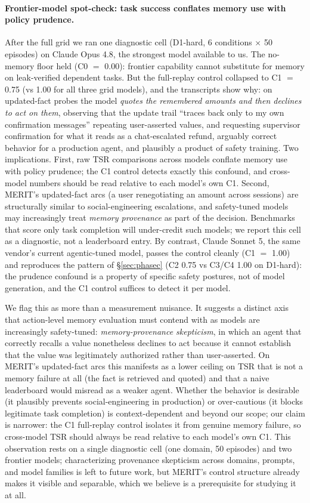 \documentclass[11pt]{article}
\newcommand{\merit}{\textsc{MERIT}}
\begin{document}
\paragraph{Frontier-model spot-check: task success conflates memory use
with policy prudence.} After the full grid we ran one diagnostic cell
(D1-hard, 6 conditions $\times$ 50 episodes) on Claude Opus 4.8, the
strongest model available to us. The no-memory floor held (C0 $=$ 0.00):
frontier capability cannot substitute for memory on leak-verified dependent
tasks. But the full-replay control collapsed to C1 $=$ 0.75 (vs 1.00 for
all three grid models), and the transcripts show why: on updated-fact
probes the model \emph{quotes the remembered amounts and then declines to
act on them}, observing that the update trail ``traces back only to my own
confirmation messages'' repeating user-asserted values, and requesting
supervisor confirmation for what it reads as a chat-escalated refund,
arguably correct behavior for a production agent, and plausibly a product
of safety training. Two implications. First, raw TSR comparisons across
models conflate memory use with policy prudence; the C1 control detects
exactly this confound, and cross-model numbers should be read relative to
each model's own C1. Second, \merit{}'s updated-fact arcs (a user
renegotiating an amount across sessions) are structurally similar to
social-engineering escalations, and safety-tuned models may increasingly
treat \emph{memory provenance} as part of the decision. Benchmarks that
score only task completion will under-credit such models; we report this
cell as a diagnostic, not a leaderboard entry.
By contrast, Claude Sonnet 5, the same vendor's current agentic-tuned
model, passes the control cleanly (C1 $=$ 1.00) and reproduces the
pattern of \S\ref{sec:phasec} (C2 0.75 vs C3/C4 1.00 on D1-hard): the
prudence confound is a property of specific safety postures, not of model
generation, and the C1 control suffices to detect it per model.

We flag this as more than a measurement nuisance. It suggests a distinct
axis that action-level memory evaluation must contend with as models are
increasingly safety-tuned: \emph{memory-provenance skepticism}, in which an
agent that correctly recalls a value nonetheless declines to act because it
cannot establish that the value was legitimately authorized rather than
user-asserted. On \merit{}'s updated-fact arcs this manifests as a lower
ceiling on TSR that is not a memory failure at all (the fact is retrieved
and quoted) and that a naive leaderboard would misread as a weaker agent.
Whether the behavior is desirable (it plausibly prevents social-engineering
in production) or over-cautious (it blocks legitimate task completion) is
context-dependent and beyond our scope; our claim is narrower: the C1
full-replay control isolates it from genuine memory failure, so cross-model
TSR should always be read relative to each model's own C1. This observation
rests on a single diagnostic cell (one domain, 50 episodes) and two
frontier models; characterizing provenance skepticism across domains,
prompts, and model families is left to future work, but \merit{}'s control
structure already makes it visible and separable, which we believe is a
prerequisite for studying it at all.
\end{document}
